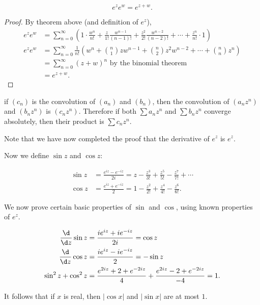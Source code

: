 \documentclass[a4paper]{article}
\begin{document}
\begin{cor}
  \[
    e^z e^w = e^{z + w}.
  \]
\end{cor}

\begin{proof}
  By theorem above (and definition of $e^z$),
  \begin{align*}
    e^z e^w &= \sum_{n = 0}^\infty \left(1\cdot \frac{w^n}{n!} + \frac{z}{1!}\frac{w^{n - 1}}{(n- 1)!} +  \frac{z^2}{2!}\frac{w^{n - 2}}{(n- 2)!} + \cdots + \frac{z^{n}}{n!}\cdot 1\right)\\
    e^z e^w &= \sum_{n = 0}^\infty \frac{1}{n!}\left(w^n + \binom{n}{1} zw^{n - 1} + \binom{n}{2}z^2 w^{n - 2} + \cdots + \binom{n}{n}z^n\right)\\
    &= \sum_{n = 0}^\infty (z + w)^n \text{ by the binomial theorem}\\
    &= e^{z + w}.
  \end{align*}
\end{proof}
\note if $(c_n)$ is the convolution of $(a_n)$ and $(b_n)$, then the convolution of $(a_nz^n)$ and $(b_nz^n)$ is $(c_nz^n)$. Therefore if both $\sum a_n z^n$ and $\sum b_nz^n$ converge absolutely, then their product is $\sum c_n z^n$.

Note that we have now completed the proof that the derivative of $e^z$ is $e^z$.

Now we define $\sin z$ and $\cos z$:
\begin{defi}
  \begin{align*}
    \sin z &= \frac{e^{iz} - e^{-iz}}{2i} = z - \frac{z^3}{3!} + \frac{z^5}{5!} - \frac{z^7}{7!} + \cdots\\
    \cos z &= \frac{e^{iz} + e^{-iz}}{2} = 1 - \frac{z^2}{2!} + \frac{z^4}{4!} - \frac{z^6}{6!}.
  \end{align*}
\end{defi}

We now prove certain basic properties of $\sin$ and $\cos$, using known properties of $e^z$.
\begin{prop}
  \begin{align*}
    \frac{\d}{\d z}\sin z &= \frac{ie^{iz} + ie^{-iz}}{2i} = \cos z\\
    \frac{\d}{\d z}\cos z &= \frac{ie^{iz} - ie^{-iz}}{2} = -\sin z\\
    \sin^2 z + \cos ^2 z &= \frac{e^{2iz} + 2 + e^{-2iz}}{4} + \frac{e^{2iz} - 2 + e^{-2iz}}{-4} = 1.
  \end{align*}
\end{prop}
It follows that if $x$ is real, then $|\cos x|$ and $|\sin x|$ are at most $1$.
\end{document}
